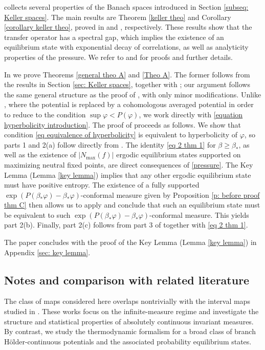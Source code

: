 \documentclass[10pt,a4paper]{amsart}
\numberwithin{equation}{section} %
\numberwithin{figure}{section} %
\renewcommand{\=}{\coloneqq}
\newcommand{\Nmax}{N_\text{max}(f)}
\begin{document}
 collects several properties of the Banach spaces introduced in Section \ref{subseq: Keller spaces}. The main results are Theorem \ref{keller theo} and Corollary \ref{corollary keller theo}, proved in \cite{Keller1} and \cite{Juan1}, respectively. These results show that the transfer operator has a spectral gap, which implies the existence of an equilibrium state with exponential decay of correlations, as well as analyticity properties of the pressure. We refer to \cite{Keller1} and \cite{Juan1} for proofs and further details.

In  we prove Theorems \ref{general theo A} and \ref{Theo A}. The former follows from the results in Section \ref{sec: Keller spaces}, together with \cite[Theorem 6]{Dobbs}; our argument follows the same general structure as the proof of \cite[Theorem B]{Juan1}, with only minor modifications. Unlike \cite{Juan1}, where the potential is replaced by a cohomologous averaged potential in order to reduce to the condition $\sup\varphi<P(\varphi)$, we work directly with \eqref{equation hyperbolicity introduction}. The proof of  proceeds as follows. We show that condition \eqref{eq equivalence of hyperbolicity} is equivalent to hyperbolicity of $\varphi$, so parts 1 and 2(a) follow directly from . The identity \eqref{eq 2 thm 1} for $\beta\geq \beta_*$, as well as the existence of $|\Nmax|$ ergodic equilibrium states supported on maximizing neutral fixed points, are direct consequences of \eqref{pressure}. The Key Lemma (Lemma \ref{key lemma}) implies that any other ergodic equilibrium state must have positive entropy. The existence of a fully supported $\exp(P(\beta_*\varphi)-\beta_*\varphi)$-conformal measure given by Proposition \ref{p: before proof thm C} then allows us to apply \cite[Theorem 6]{Dobbs} and conclude that such an equilibrium state must be equivalent to such $\exp(P(\beta_*\varphi)-\beta_*\varphi)$-conformal measure. This yields part 2(b). Finally, part 2(c) follows from part 3 of  together with \eqref{eq 2 thm 1}.

The paper concludes with the proof of the Key Lemma (Lemma \ref{key lemma}) in Appendix \ref{sec: key lemma}.

\subsection{Notes and comparison with related literature}
The class of maps considered here overlaps nontrivially with the interval maps studied in \cite{zweimuller1,zweimuller2,MelbourneTerhesiu}. These works focus on the infinite-measure regime and investigate the structure and statistical properties of absolutely continuous invariant measures. By contrast, we study the thermodynamic formalism for a broad class of branch Hölder-continuous potentials and the associated probability equilibrium states.
\end{document}

